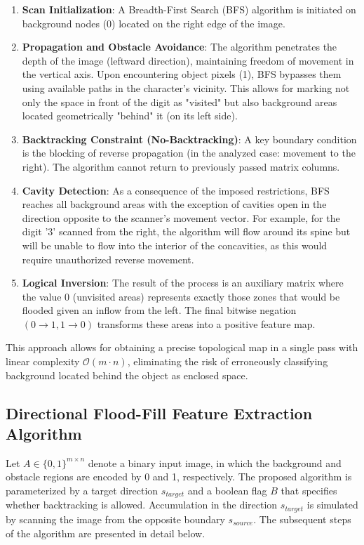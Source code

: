 \documentclass[a4paper,fleqn]{cas-dc}
\begin{document}
\begin{enumerate}
    \item \textbf{Scan Initialization}: A Breadth-First Search (BFS) algorithm is initiated on background nodes (0) located on the right edge of the image.
    \item \textbf{Propagation and Obstacle Avoidance}: The algorithm penetrates the depth of the image (leftward direction), maintaining freedom of movement in the vertical axis. Upon encountering object pixels (1), BFS bypasses them using available paths in the character's vicinity. This allows for marking not only the space in front of the digit as "visited" but also background areas located geometrically "behind" it (on its left side).
    \item \textbf{Backtracking Constraint (No-Backtracking)}: A key boundary condition is the blocking of reverse propagation (in the analyzed case: movement to the right). The algorithm cannot return to previously passed matrix columns.
    \item \textbf{Cavity Detection}: As a consequence of the imposed restrictions, BFS reaches all background areas with the exception of cavities open in the direction opposite to the scanner's movement vector. For example, for the digit '3' scanned from the right, the algorithm will flow around its spine but will be unable to flow into the interior of the concavities, as this would require unauthorized reverse movement.
    \item \textbf{Logical Inversion}: The result of the process is an auxiliary matrix where the value 0 (unvisited areas) represents exactly those zones that would be flooded given an inflow from the left. The final bitwise negation $(0 \rightarrow 1, 1 \rightarrow 0)$ transforms these areas into a positive feature map.
\end{enumerate}

This approach allows for obtaining a precise topological map in a single pass with linear complexity $\mathcal{O}(m \cdot n)$, eliminating the risk of erroneously classifying background located behind the object as enclosed space.




\subsection{Directional Flood-Fill Feature Extraction Algorithm}

Let $A \in \{0,1\}^{m \times n}$ denote a binary input image, in which the background and obstacle regions are encoded by 0 and 1, respectively. The proposed algorithm is parameterized by a target direction $s_{target}$ and a boolean flag $B$ that specifies whether backtracking is allowed. Accumulation in the direction $s_{target}$ is simulated by scanning the image from the opposite boundary $s_{source}$. The subsequent steps of the algorithm are presented in detail below.
\end{document}
